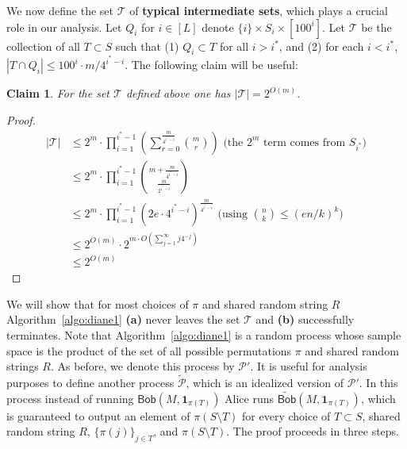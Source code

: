 \documentclass[11pt]{article}
\newtheorem{claim}{Claim}
\newcommand{\query}{\mathsf{Bob}}
\begin{document}
We now define the set $\mathcal{T}$ of {\bf typical intermediate sets}, which plays a crucial role in our analysis.  Let $Q_i$ for $i\in [L]$ denote $\{i\} \times S_i \times [100^i]$. Let $\mathcal{T}$ be the collection of all $T\subset S$ such that (1) $Q_i\subset T$ for all $i>i^*$, and (2) for each $i < i^*$, $|T\cap Q_i| \le 100^i\cdot  m/4^{i^*-i}$.  The following claim will be useful:
\begin{claim}\label{cl:size-of-t}
For the set $\mathcal{T}$ defined above one has $|\mathcal{T}|=2^{O(m)}$.
\end{claim}
\begin{proof}
\begin{align*}
|\mathcal T| &\le 2^m \cdot \prod_{i=1}^{i^*-1}\left(\sum_{r=0}^{\frac m{4^{i^*-i}}} \binom mr\right)\text{ (the }2^m\text{ term comes from }S_{i^*}\text{)}\\
{}&\le 2^m \cdot \prod_{i=1}^{i^*-1} \binom{m + \frac m{4^{i^* - i}}}{\frac m{2^{i^* - i}}}\\
{}&\le 2^m \cdot \prod_{i=1}^{i^*-1} (2e\cdot 4^{i^*-i})^{\frac m{4^{i^* - i}}}\text{ (using }\binom nk \le (en/k)^k\textrm{)}\\
{}&\le 2^{O(m)} \cdot 2^{m\cdot O(\sum_{j=1}^\infty j 4^{-j})} \\
{}& \le 2^{O(m)}
\end{align*}
\end{proof}


We will show that for most choices of $\pi$ and shared random string $R$ Algorithm~\ref{algo:diane1} {\bf (a)} never leaves the set $\mathcal{T}$ and {\bf (b)} successfully terminates.  Note that Algorithm~\ref{algo:diane1} is a random process whose sample space is the product of the set of all possible permutations $\pi$ and shared random strings $R$. As before, we denote this process by $\mathcal{P}'$. It is useful for analysis purposes to define another process $\widetilde{\mathcal{P}}$, which is an idealized version of $\mathcal{P}'$. In this process instead of running  $\query(M, \mathbf{1}_{\pi(T)})$ Alice runs  $\widetilde{\query}(M, \mathbf{1}_{\pi(T)})$, which is guaranteed to output an element of $\pi(S\setminus T)$ for every choice of  $T\subset S$, shared random string $R$, $\{\pi(j)\}_{j\in T}$, and $\pi(S\setminus T)$. The proof proceeds in three steps.
\end{document}
